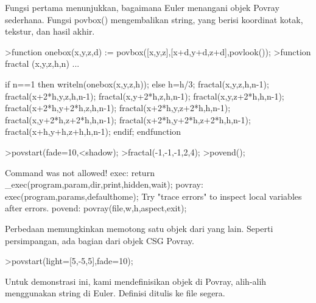 \documentclass{article}
\begin{document}
\begin{eulernotebook}
\begin{eulercomment}
\begin{eulercomment}
\begin{eulercomment}
Fungsi pertama menunjukkan, bagaimana Euler menangani objek Povray
sederhana. Fungsi povbox() mengembalikan string, yang berisi koordinat
kotak, tekstur, dan hasil akhir.
\end{eulercomment}
\begin{eulerprompt}
>function onebox(x,y,z,d) := povbox([x,y,z],[x+d,y+d,z+d],povlook());
>function fractal (x,y,z,h,n) ...
\end{eulerprompt}
\begin{eulerudf}
   if n==1 then writeln(onebox(x,y,z,h));
   else
     h=h/3;
     fractal(x,y,z,h,n-1);
     fractal(x+2*h,y,z,h,n-1);
     fractal(x,y+2*h,z,h,n-1);
     fractal(x,y,z+2*h,h,n-1);
     fractal(x+2*h,y+2*h,z,h,n-1);
     fractal(x+2*h,y,z+2*h,h,n-1);
     fractal(x,y+2*h,z+2*h,h,n-1);
     fractal(x+2*h,y+2*h,z+2*h,h,n-1);
     fractal(x+h,y+h,z+h,h,n-1);
   endif;
  endfunction
\end{eulerudf}
\begin{eulerprompt}
>povstart(fade=10,<shadow);
>fractal(-1,-1,-1,2,4);
>povend();
\end{eulerprompt}
\begin{euleroutput}
  Command was not allowed!
  exec:
      return _exec(program,param,dir,print,hidden,wait);
  povray:
      exec(program,params,defaulthome);
  Try "trace errors" to inspect local variables after errors.
  povend:
      povray(file,w,h,aspect,exit); 
\end{euleroutput}
\begin{eulercomment}
Perbedaan memungkinkan memotong satu objek dari yang lain. Seperti
persimpangan, ada bagian dari objek CSG Povray.
\end{eulercomment}
\begin{eulerprompt}
>povstart(light=[5,-5,5],fade=10);
\end{eulerprompt}
\begin{eulercomment}
Untuk demonstrasi ini, kami mendefinisikan objek di Povray, alih-alih
menggunakan string di Euler. Definisi ditulis ke file segera.


\end{eulercomment}
\end{eulercomment}
\end{eulercomment}
\end{eulernotebook}
\end{document}
